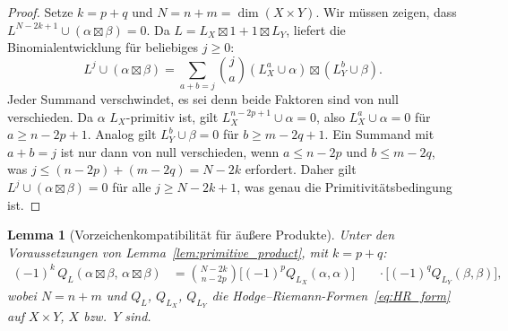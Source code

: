 \documentclass[aps,prd,twocolumn,superscriptaddress,nofootinbib]{revtex4-2}
\newtheorem{lemma}[theorem]{Lemma}
\theoremstyle{definition}
\theoremstyle{remark}
\def\\{ }%
\begin{document}
\begin{proof}
Setze $k = p + q$ und $N = n + m = \dim(X \times Y)$. Wir müssen zeigen, dass $L^{N-2k+1} \cup (\alpha \boxtimes \beta) = 0$. Da $L = L_X \boxtimes 1 + 1 \boxtimes L_Y$, liefert die Binomialentwicklung für beliebiges $j \geq 0$:
\[
L^j \cup (\alpha \boxtimes \beta) = \sum_{a+b=j} \binom{j}{a} (L_X^a \cup \alpha) \boxtimes (L_Y^b \cup \beta).
\]
Jeder Summand verschwindet, es sei denn beide Faktoren sind von null verschieden. Da $\alpha$ $L_X$-primitiv ist, gilt $L_X^{n-2p+1} \cup \alpha = 0$, also $L_X^a \cup \alpha = 0$ für $a \geq n - 2p + 1$. Analog gilt $L_Y^b \cup \beta = 0$ für $b \geq m - 2q + 1$. Ein Summand mit $a + b = j$ ist nur dann von null verschieden, wenn $a \leq n - 2p$ und $b \leq m - 2q$, was $j \leq (n - 2p) + (m - 2q) = N - 2k$ erfordert. Daher gilt $L^j \cup (\alpha \boxtimes \beta) = 0$ für alle $j \geq N - 2k + 1$, was genau die Primitivitätsbedingung ist.
\end{proof}

\begin{lemma}[Vorzeichenkompatibilität für äußere Produkte]
\label{lem:sign_product}
Unter den Voraussetzungen von Lemma~\ref{lem:primitive_product}, mit $k = p + q$:
\begin{equation}
\begin{aligned}
(-1)^k\, Q_L(\alpha \boxtimes \beta,\, \alpha \boxtimes \beta)
&= \binom{N-2k}{n-2p}
   \bigl[(-1)^p Q_{L_X}(\alpha, \alpha)\bigr]\\
&\quad\cdot \bigl[(-1)^q Q_{L_Y}(\beta, \beta)\bigr],
\end{aligned}
\label{eq:sign_kunneth}
\end{equation}
wobei $N = n + m$ und $Q_L$, $Q_{L_X}$, $Q_{L_Y}$ die Hodge--Riemann-Formen~\eqref{eq:HR_form} auf $X \times Y$, $X$ bzw.\ $Y$ sind.
\end{lemma}
\end{document}
